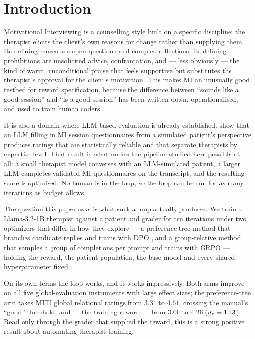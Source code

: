 \section{Introduction}
\label{sec:intro}

Motivational Interviewing \citep{miller1991mi} is a counselling style built on a specific
discipline: the therapist elicits the client's own reasons for change rather than supplying
them. Its defining moves are open questions and complex reflections; its defining
prohibitions are unsolicited advice, confrontation, and --- less obviously --- the kind of
warm, unconditional praise that feels supportive but substitutes the therapist's approval
for the client's motivation. This makes MI an unusually good testbed for reward
specification, because the difference between ``sounds like a good session'' and ``is a good
session'' has been written down, operationalised, and used to train human coders
\citep{moyers2016miti}.

It is also a domain where LLM-based evaluation is already established. \citet{yosef2024assessing}
show that an LLM filling in MI session questionnaires from a simulated patient's
perspective produces ratings that are statistically reliable and that separate therapists by
expertise level. That result is what makes the pipeline studied here possible at all: a
small therapist model converses with an LLM-simulated patient, a larger LLM completes
validated MI questionnaires on the transcript, and the resulting score is optimised. No
human is in the loop, so the loop can be run for as many iterations as budget allows.

The question this paper asks is what such a loop actually produces. We train a
Llama-3.2-1B therapist against a \primaryjudge{} patient and grader for ten iterations
under two optimizers that differ in how they explore --- a preference-tree method that
branches candidate replies and trains with DPO \citep{rafailov2023dpo,baruch2025pto}, and a
group-relative method that samples a group of completions per prompt and trains with GRPO
\citep{shao2024deepseekmath} --- holding the reward, the patient population, the base model
and every shared hyperparameter fixed.

On its own terms the loop works, and it works impressively. Both arms improve on all five
global-evaluation instruments with large effect sizes; the preference-tree arm takes MITI
global relational ratings from $3.34$ to $4.61$, crossing the manual's ``good'' threshold,
and \QQ{} --- the training reward --- from $3.00$ to $4.26$ ($d_z=1.43$). Read only through
the grader that supplied the reward, this is a strong positive result about automating
therapist training.

